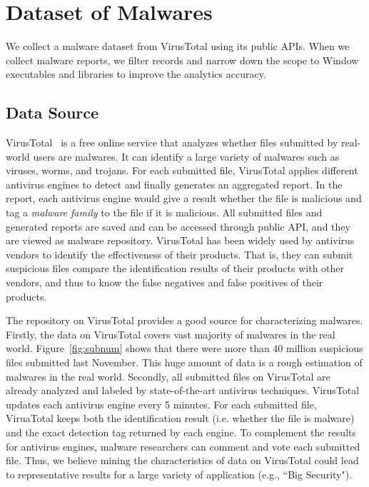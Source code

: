 \section{Dataset of Malwares}
We collect a malware dataset from VirusTotal using its public APIs. When we collect malware reports, we filter records and narrow down the scope to Window executables and libraries to improve the analytics accuracy. 
\subsection{Data Source}
VirusTotal~\cite{virustotal} is a free online service that analyzes whether files submitted by real-world users are malwares. It can identify  a large variety of malwares such as viruses, worms, and trojans. For each submitted file, VirusTotal applies different antivirus engines to detect and finally generates an aggregated report. In the report, each antivirus engine would give a result whether the file is malicious and tag a \emph{malware family} to the file if it is malicious.  All submitted files and generated reports are saved and can be accessed through public API, and they are viewed as malware repository. VirusTotal has been widely used by antivirus vendors to identify the effectiveness of their products. That is, they can submit suspicious files compare the identification results of their products with other vendors, and thus to know the false negatives and false positives of their products.

The repository on VirusTotal provides a good source for characterizing malwares. Firstly, the data on VirusTotal covers vast majority of malwares in the real world.
Figure~\ref{fig:subnum} shows that there were more than 40 million suspicious files submitted last November. 
This huge amount of data is a rough estimation of malwares in the real world. 
Secondly, all submitted files on VirusTotal are already analyzed and labeled by state-of-the-art antivirus techniques. VirusTotal updates each antivirus engine every 5 minutes. For each submitted file, ViruaTotal keeps both the identification result (i.e. whether the file is malware) and the exact detection tag returned by each engine. To complement the results for antivirus engines, malware researchers can comment and vote each submitted file. Thus, we believe mining the characteristics of data on VirusTotal could lead to representative results for a large variety of application (e.g., ``Big Security"). 


